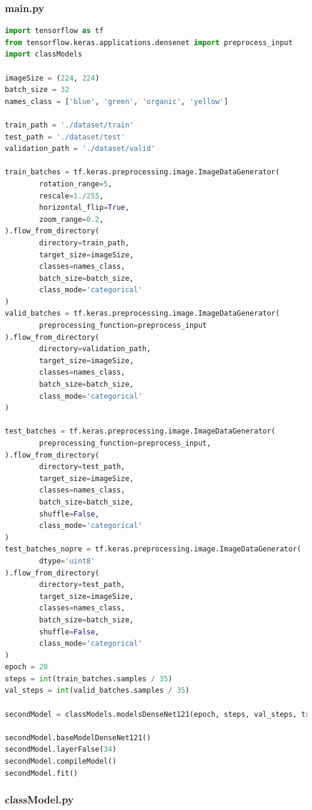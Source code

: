 ﻿\documentclass[10pt,a4paper,twocolumn,twoside]{article}
\begin{document}
\subsubsection{main.py}
\begin{lstlisting}[language=Python]
import tensorflow as tf
from tensorflow.keras.applications.densenet import preprocess_input
import classModels

imageSize = (224, 224)
batch_size = 32
names_class = ['blue', 'green', 'organic', 'yellow']

train_path = './dataset/train'
test_path = './dataset/test'
validation_path = './dataset/valid'

train_batches = tf.keras.preprocessing.image.ImageDataGenerator(
        rotation_range=5,
        rescale=1./255,
        horizontal_flip=True,
        zoom_range=0.2,
).flow_from_directory(
        directory=train_path,
        target_size=imageSize,
        classes=names_class,
        batch_size=batch_size,
        class_mode='categorical'
)
valid_batches = tf.keras.preprocessing.image.ImageDataGenerator(
        preprocessing_function=preprocess_input
).flow_from_directory(
        directory=validation_path,
        target_size=imageSize,
        classes=names_class,
        batch_size=batch_size,
        class_mode='categorical'
)

test_batches = tf.keras.preprocessing.image.ImageDataGenerator(
        preprocessing_function=preprocess_input,
).flow_from_directory(
        directory=test_path,
        target_size=imageSize,
        classes=names_class,
        batch_size=batch_size,
        shuffle=False,
        class_mode='categorical'
)
test_batches_nopre = tf.keras.preprocessing.image.ImageDataGenerator(
        dtype='uint8'
).flow_from_directory(
        directory=test_path,
        target_size=imageSize,
        classes=names_class,
        batch_size=batch_size,
        shuffle=False,
        class_mode='categorical'
)
epoch = 20
steps = int(train_batches.samples / 35)
val_steps = int(valid_batches.samples / 35)

secondModel = classModels.modelsDenseNet121(epoch, steps, val_steps, train_batches, valid_batches, test_batches, test_batches_nopre, True)

secondModel.baseModelDenseNet121()
secondModel.layerFalse(34)
secondModel.compileModel()
secondModel.fit()
\end{lstlisting}

\subsubsection{classModel.py}
\end{document}
